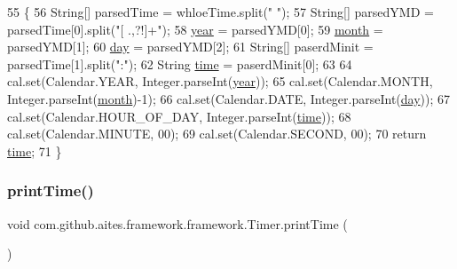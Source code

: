 \begin{DoxyCode}
55                                              \{
56         String[] parsedTime = whloeTime.split(\textcolor{stringliteral}{" "});
57         String[] parsedYMD = parsedTime[0].split(\textcolor{stringliteral}{"[ .,?!]+"});
58         \mbox{\hyperlink{classcom_1_1github_1_1aites_1_1framework_1_1framework_1_1_timer_aa8703c39746c1952e9e969472d3beca4}{year}} = parsedYMD[0];
59         \mbox{\hyperlink{classcom_1_1github_1_1aites_1_1framework_1_1framework_1_1_timer_a787e26630dfa348baa4e02172128ea3a}{month}} = parsedYMD[1];
60         \mbox{\hyperlink{classcom_1_1github_1_1aites_1_1framework_1_1framework_1_1_timer_a875396d63f45c8cd4db75f3b85ac398d}{day}} = parsedYMD[2];
61         String[] paserdMinit = parsedTime[1].split(\textcolor{stringliteral}{":"});
62         String \mbox{\hyperlink{classcom_1_1github_1_1aites_1_1framework_1_1framework_1_1_timer_a04901e0f7fd1f7024218cba52d7a8b26}{time}} = paserdMinit[0];
63     
64         cal.set(Calendar.YEAR, Integer.parseInt(\mbox{\hyperlink{classcom_1_1github_1_1aites_1_1framework_1_1framework_1_1_timer_aa8703c39746c1952e9e969472d3beca4}{year}}));
65         cal.set(Calendar.MONTH, Integer.parseInt(\mbox{\hyperlink{classcom_1_1github_1_1aites_1_1framework_1_1framework_1_1_timer_a787e26630dfa348baa4e02172128ea3a}{month}})-1);
66         cal.set(Calendar.DATE, Integer.parseInt(\mbox{\hyperlink{classcom_1_1github_1_1aites_1_1framework_1_1framework_1_1_timer_a875396d63f45c8cd4db75f3b85ac398d}{day}}));
67         cal.set(Calendar.HOUR\_OF\_DAY, Integer.parseInt(\mbox{\hyperlink{classcom_1_1github_1_1aites_1_1framework_1_1framework_1_1_timer_a04901e0f7fd1f7024218cba52d7a8b26}{time}}));
68         cal.set(Calendar.MINUTE, 00);
69         cal.set(Calendar.SECOND, 00);
70         \textcolor{keywordflow}{return} \mbox{\hyperlink{classcom_1_1github_1_1aites_1_1framework_1_1framework_1_1_timer_a04901e0f7fd1f7024218cba52d7a8b26}{time}};
71     \}
\end{DoxyCode}
\mbox{\label{classcom_1_1github_1_1aites_1_1framework_1_1framework_1_1_timer_a33a5477618b0c9ec0fdb4f3446cad4f1}} 
\subsubsection{\texorpdfstring{print\+Time()}{printTime()}}
{\footnotesize\ttfamily void com.\+github.\+aites.\+framework.\+framework.\+Timer.\+print\+Time (\begin{DoxyParamCaption}{ }\end{DoxyParamCaption})\hspace{0.3cm}{\ttfamily [private]}}



